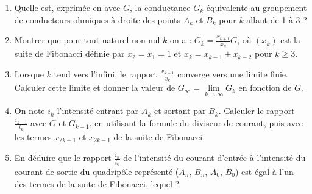\begin{exercice}
  \begin{enumerate}
    \item Quelle est, exprimée en avec \(G\), la conductance \(G_k\) équivalente au groupement de conducteurs ohmiques à droite des points \(A_k\) et \(B_k\) pour \(k\) allant de 1 à 3 ?
    \item Montrer que pour tout naturel non nul \(k\) on a : \(G_k = \frac{x_{k+1}}{x_k} G\), où \((x_k)\) est la suite de Fibonacci définie par \(x_2=x_1=1\) et \(x_k = x_{k-1}+x_{k-2}\) pour \(k \geq 3\).
    \item Lorsque \(k\) tend vers l'infini, le rapport \(\frac{x_{k+1}}{x_k}\) converge vers une limite finie. Calculer cette limite et donner la valeur de \(G_\infty = \lim\limits_{k \to \infty} G_k\) en fonction de \(G\).
    \item On note \(i_k\) l'intensité entrant par \(A_k\) et sortant par \(B_k\). Calculer le rapport \(\frac{i_{k-1}}{i_k}\) avec \(G\) et \(G_{k-1}\), en utilisant la formule du diviseur de courant, puis avec les termes \(x_{2k+1}\) et \(x_{2k-1}\) de la suite de Fibonacci.
    \item En déduire que le rapport \(\frac{i_n}{i_0}\) de l'intensité du courant d'entrée à l'intensité du courant de sortie du quadripôle représenté (\(A_n\), \(B_n\), \(A_0\), \(B_0\)) est égal à l'un des termes de la suite de Fibonacci, lequel ?
  \end{enumerate}
\end{exercice}
